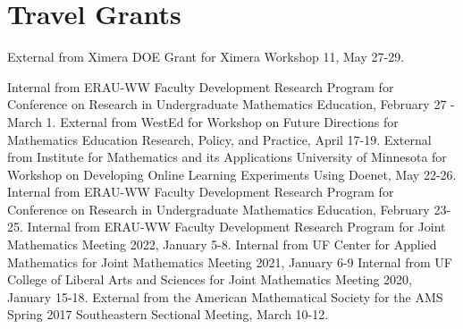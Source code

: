 \documentclass[10pt,a4paper,sans]{moderncv}
\begin{document}
	\section{Travel Grants}
		{External}
		{}
		{from Ximera DOE Grant for Ximera Workshop 11, May 27-29.}
		{}{}
	
		{Internal}
		{}
		{from ERAU-WW Faculty Development Research Program for Conference on Research in Undergraduate Mathematics Education, February 27 - March 1.}
		{}{}
	{External}
	{}
	{from WestEd for Workshop on Future Directions for Mathematics Education Research, Policy, and Practice, April 17-19.}
	{}{}
	{External}
	{}
	{from Institute for Mathematics and its Applications University of Minnesota for Workshop on Developing Online Learning Experiments Using Doenet, May 22-26.}
	{}{}
	{Internal}
	{}
	{from ERAU-WW Faculty Development Research Program for Conference on Research in Undergraduate Mathematics Education, February 23-25.}
	{}{}
	{Internal}
	{}
	{from ERAU-WW Faculty Development Research Program for Joint Mathematics Meeting 2022, January 5-8.}
	{}{}
	{Internal}
	{}
	{from UF Center for Applied Mathematics for Joint Mathematics Meeting 2021, January 6-9}
	{}{}
	{Internal}
	{}
	{from UF College of Liberal Arts and Sciences for Joint Mathematics Meeting 2020, January 15-18.}
	{}{}
	{External}
	{}
	{from the American Mathematical Society for the AMS Spring 2017 Southeastern Sectional Meeting, March 10-12.}
	{}{}
	
	
	
	
	
\end{document}
